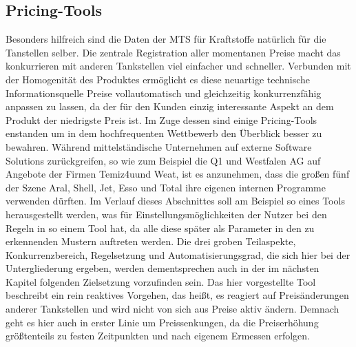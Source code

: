 \documentclass[12pt,a4paper,bibliography=totocnumbered,listof=totocnumbered]{scrartcl}
\begin{document}
\subsection{Pricing-Tools}

Besonders hilfreich sind die Daten der MTS für Kraftstoffe natürlich für die Tanstellen selber. Die zentrale Registration aller momentanen Preise macht das konkurrieren mit anderen Tankstellen viel einfacher und schneller. Verbunden mit der Homogenität des Produktes ermöglicht es diese neuartige technische Informationsquelle Preise vollautomatisch und gleichzeitig konkurrenzfähig anpassen zu lassen, da der für den Kunden einzig interessante Aspekt an dem Produkt der niedrigste Preis ist. Im Zuge dessen sind einige Pricing-Tools enstanden um in dem hochfrequenten Wettbewerb den Überblick besser zu bewahren. Während mittelständische Unternehmen auf externe Software Solutions zurückgreifen, so wie zum Beispiel die Q1 und Westfalen AG auf Angebote der Firmen Temiz4u\footnotemark[1] und Weat\footnotemark[2], ist es anzunehmen, dass die großen fünf der Szene Aral, Shell, Jet, Esso und Total ihre eigenen internen Programme verwenden dürften. Im Verlauf dieses Abschnittes soll am Beispiel so eines Tools herausgestellt werden, was für Einstellungsmöglichkeiten der Nutzer bei den Regeln in so einem Tool hat, da alle diese später als Parameter in den zu erkennenden Mustern auftreten werden. Die drei groben Teilaspekte, Konkurrenzbereich, Regelsetzung und Automatisierungsgrad, die sich hier bei der Untergliederung ergeben, werden dementsprechen auch in der im nächsten Kapitel folgenden Zielsetzung vorzufinden sein. Das hier vorgestellte Tool beschreibt ein rein reaktives Vorgehen, das heißt, es reagiert auf Preisänderungen anderer Tankstellen und wird nicht von sich aus Preise aktiv ändern. Demnach geht es hier auch in erster Linie um Preissenkungen, da die Preiserhöhung größtenteils zu festen Zeitpunkten und nach eigenem Ermessen erfolgen.


\end{document}
